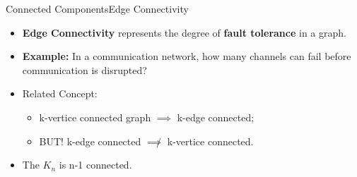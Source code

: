 \begin{frame}{Connected Components}{Edge Connectivity}

  {\large

    \begin{itemize}

    \item {\bf Edge Connectivity} represents the degree of
      {\bf fault tolerance} in a graph.


    \item {\bf Example:} In a communication network, how many
      channels can fail before communication is disrupted?

      \bigskip

    \item Related Concept: 

      \begin{itemize}
      \item k-vertice connected graph $\implies$ k-edge connected;
      \item \alert{BUT!} k-edge connected $\not\implies$ k-vertice
        connected.
      \end{itemize}

    \item The  $K_n$ is n-1 connected.
    \end{itemize}
  }

\end{frame}

